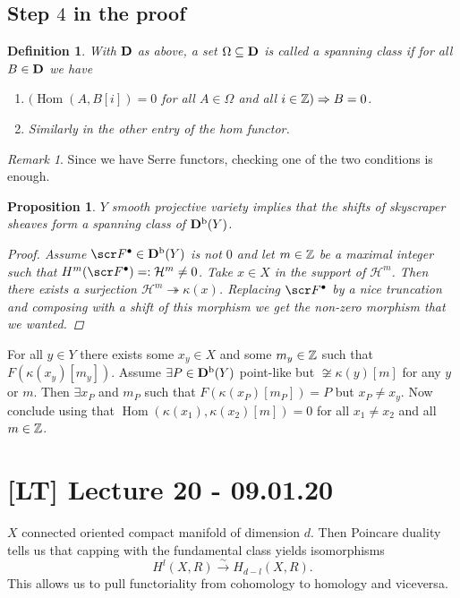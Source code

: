 \documentclass[A4paper, british]{amsart}
\theoremstyle{darkgreentheorem}
\newtheorem{prop}[thm]{Proposition}
\theoremstyle{darkbluedefinition}
\newtheorem{defn}[thm]{Definition}
\theoremstyle{darkredexample}
\theoremstyle{remark}
\newtheorem{rem}[thm]{Remark}
\DeclareMathOperator{\Hom}{Hom}
\renewcommand{\H}{\mathcal{H}}
\newcommand{\1}{\mathbbm{1}}
\newcommand{\grd}{^{\bullet}}
\newcommand{\sub}{\subseteq}
\newcommand{\epi}{\twoheadrightarrow}
\begin{document}
\subsection{Step $4$ in the proof}

\begin{defn}
    With $\mathbf{D}$ as above, a set $\Omega\sub \D$ is called a \textit{spanning class} if for all $B\in \mathbf{D}$ we have
    \begin{enumerate}
	\item $(\Hom(A,B[i])=0 $ for all $A\in \Omega$ and all $i\in \mathbb{Z} ) \Rightarrow B=0$.
	\item Similarly in the other entry of the hom functor.
    \end{enumerate}
\end{defn}

\begin{rem}
    Since we have Serre functors, checking one of the two conditions is enough.
\end{rem}

\begin{prop}
    $Y$ smooth projective variety implies that the shifts of skyscraper sheaves form a spanning class of $\mathbf{D}^{\mathrm{b}}(Y)$.
    \begin{proof}
	Assume $\F\grd\in \Db(Y)$ is not $0$ and let $m\in \mathbb{Z}$ be a maximal integer such that $H^{m}(\F\grd)=:\H^{m}\neq 0$.
	Take $x\in X$ in the support of $\H^{m}$.
	Then there exists a surjection $\H^{m}\epi \kappa(x)$.
	Replacing $\F\grd$ by a nice truncation and composing with a shift of this morphism we get the non-zero morphism that we wanted.
    \end{proof}
\end{prop}

For all $y\in Y$ there exists some $x_{y}\in X$ and some $m_{y}\in \mathbb{Z}$ such that $F(\kappa(x_{y})[m_{y}])$.
Assume $\exists P\in \mathbf{D}^{\mathrm{b}}(Y)$ point-like but $\not\cong\kappa(y)[m]$ for any $y$ or $m$.
Then $\exists x_{P}$ and $m_{P}$ such that $F(\kappa(x_{P})[m_{P}])=P$ but $x_{P}\neq x_{y}$.
Now conclude using that $\Hom(\kappa(x_{1}),\kappa(x_{2})[m])=0$ for all $x_{1}\neq x_{2}$ and all $m\in \mathbb{Z}$.

\section{[LT] Lecture 20 - 09.01.20}

$X$ connected oriented compact manifold of dimension $d$.
Then Poincare duality tells us that capping with the fundamental class yields isomorphisms
\[ H^{l}(X,R)\xrightarrow{\sim}H_{d-l}(X,R). \]
This allows us to pull functoriality from cohomology to homology and viceversa.
\end{document}
